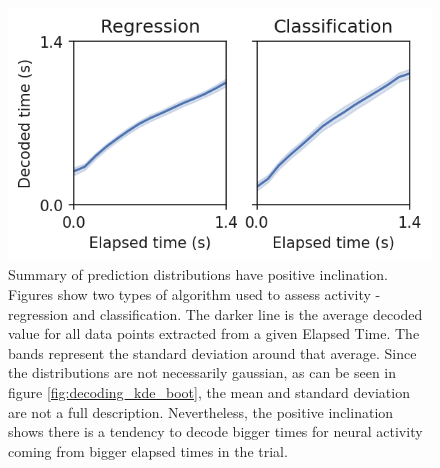     \begin{figure}[ht]
        \centering
        \includegraphics{figures/clf_reg_mean_simple.png}
        \caption[Summary of prediction distributions have positive inclination]{Summary of prediction distributions have positive inclination. Figures show two types of algorithm used to assess activity - regression and classification. The darker line is the average decoded value for all data points extracted from a given Elapsed Time. The bands represent the standard deviation around that average. Since the distributions are not necessarily gaussian, as can be seen in figure \ref{fig:decoding_kde_boot}, the mean and standard deviation are not a full description. Nevertheless, the positive inclination shows there is a tendency to decode bigger times for neural activity coming from bigger elapsed times in the trial.}
        \label{fig:decoding_line_boot}
    \end{figure}

